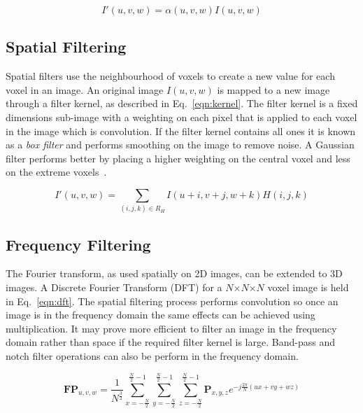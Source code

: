 \documentclass[journal]{IEEEtran}
\begin{document}
\begin{equation}
	I'(u,v,w) = \alpha(u,v,w)I(u,v,w)
	\label{eqn:point} 
\end{equation}



\subsection{Spatial Filtering}
Spatial filters use the neighbourhood of voxels to create a new value for each voxel in an image. 
An original image $I(u,v,w)$ is mapped to a new image through a filter kernel, as described in Eq.~\ref{eqn:kernel}.
The filter kernel is a fixed dimensions sub-image with a weighting on each pixel that is applied to each voxel in the image which is convolution.
If the filter kernel contains all ones it is known as a \emph{box filter} and performs smoothing on the image to remove noise.
A Gaussian filter performs better by placing a higher weighting on the central voxel and less on the extreme voxels~\cite{lohmann1998volumetric}.


\begin{equation}
	I'(u,v,w) = \sum\limits_{(i,j,k) \in R_H} I(u + i,v + j, w + k)H(i,j,k)
	\label{eqn:kernel} 
\end{equation}



\subsection{Frequency Filtering}
The Fourier transform, as used spatially on 2D images, can be extended to 3D images.
A Discrete Fourier Transform (DFT) for a $N$$\times$$N$$\times$$N$ voxel image is held in Eq.~\ref{eqn:dft}.
The spatial filtering process performs convolution so once an image is in the frequency domain the same effects can be achieved using multiplication.
It may prove more efficient to filter an image in the frequency domain rather than space if the required filter kernel is large.
Band-pass and notch filter operations can also be perform in the frequency domain.

\begin{equation}
	\textbf{FP}_{u,v,w} = \frac{1}{N^{\frac{3}{2}}} \sum\limits_{x=-\frac{N}{2}}^{\frac{N}{2}-1}\sum\limits_{y=-\frac{N}{2}}^{\frac{N}{2}-1}\sum\limits_{z=-\frac{N}{2}}^{\frac{N}{2}-1}\textbf{P}_{x,y,z}e^{-j\frac{2\pi}{N}(ux + vy + wz)}
	\label{eqn:dft} 
\end{equation}
\end{document}
